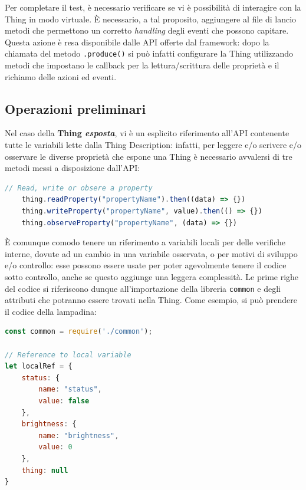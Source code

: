 \documentclass[12pt,a4paper,openright,oneside]{report}
\begin{document}
Per completare il test, è necessario verificare se vi è possibilità di interagire con la Thing in modo virtuale. È necessario, a tal proposito, aggiungere al file di lancio metodi che permettono un corretto \textit{handling} degli eventi che possono capitare. Questa azione è resa disponibile dalle API offerte dal framework: dopo la chiamata del metodo \texttt{.produce()} si può infatti configurare la Thing utilizzando metodi che impostano le callback per la lettura/scrittura delle proprietà e il richiamo delle azioni ed eventi.\\

\subsection{Operazioni preliminari}

Nel caso della \textbf{Thing \textit{esposta}}, vi è un esplicito riferimento all'API contenente tutte le variabili lette dalla Thing Description: infatti, per leggere e/o scrivere e/o osservare le diverse proprietà che espone una Thing è necessario avvalersi di tre metodi messi a disposizione dall'API:
\begin{lstlisting}[language=JavaScript,caption={Metodi per leggere, scrivere o osservare}]
	// Read, write or obsere a property
	thing.readProperty("propertyName").then((data) => {})
	thing.writeProperty("propertyName", value).then(() => {})
	thing.observeProperty("propertyName", (data) => {})
\end{lstlisting}

È comunque comodo tenere un riferimento a variabili locali per delle verifiche interne, dovute ad un cambio in una variabile osservata, o per motivi di sviluppo e/o controllo: esse possono essere usate per poter agevolmente tenere il codice sotto controllo, anche se questo aggiunge una leggera complessità. Le prime righe del codice si riferiscono dunque all'importazione della libreria \texttt{common} e degli attributi che potranno essere trovati nella Thing. Come esempio, si può prendere il codice della lampadina:

\begin{lstlisting}[language=JavaScript,caption={Inizio del codice di \texttt{bulb.js}},label=lst:bulb.js]
const common = require('./common');

// Reference to local variable
let localRef = {
	status: {
		name: "status",
		value: false
	},
	brightness: {
		name: "brightness",
		value: 0
	},
	thing: null
}
\end{lstlisting}
\end{document}
